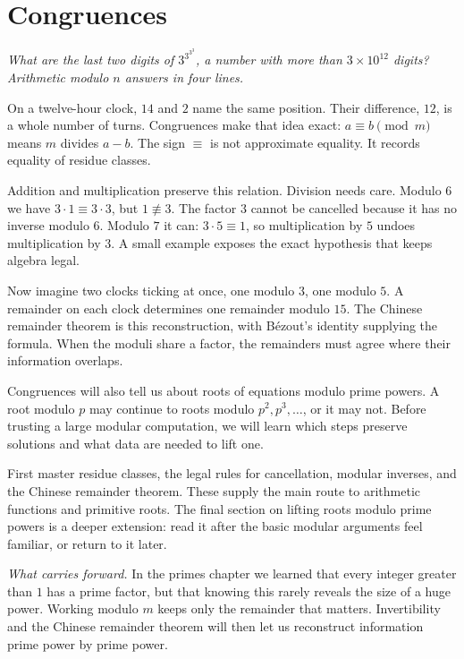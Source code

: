 \chapter{Congruences}\label{ch:congruences}

\begin{center}\itshape
What are the last two digits of $3^{3^{3^3}}$, a number with more than $3\times10^{12}$ digits?\\
Arithmetic modulo $n$ answers in four lines.
\end{center}


On a twelve-hour clock, $14$ and $2$ name the same position. Their difference, $12$, is a whole number of turns. Congruences make that idea exact: $a\equiv b\pmod m$ means $m$ divides $a-b$. The sign $\equiv$ is not approximate equality. It records equality of residue classes.

Addition and multiplication preserve this relation. Division needs care. Modulo $6$ we have $3\cdot1\equiv3\cdot3$, but $1\not\equiv3$. The factor $3$ cannot be cancelled because it has no inverse modulo $6$. Modulo $7$ it can: $3\cdot5\equiv1$, so multiplication by $5$ undoes multiplication by $3$. A small example exposes the exact hypothesis that keeps algebra legal.

Now imagine two clocks ticking at once, one modulo $3$, one modulo $5$. A remainder on each clock determines one remainder modulo $15$. The Chinese remainder theorem is this reconstruction, with Bézout's identity supplying the formula. When the moduli share a factor, the remainders must agree where their information overlaps.

Congruences will also tell us about roots of equations modulo prime powers. A root modulo $p$ may continue to roots modulo $p^2,p^3,\ldots$, or it may not. Before trusting a large modular computation, we will learn which steps preserve solutions and what data are needed to lift one.

\begin{reminder}
First master residue classes, the legal rules for cancellation, modular inverses, and the Chinese remainder theorem. These supply the main route to arithmetic functions and primitive roots. The final section on lifting roots modulo prime powers is a deeper extension: read it after the basic modular arguments feel familiar, or return to it later.
\end{reminder}


\noindent\emph{What carries forward.} In the primes chapter we learned that every integer greater than $1$ has a prime factor, but that knowing this rarely reveals the size of a huge power. Working modulo $m$ keeps only the remainder that matters. Invertibility and the Chinese remainder theorem will then let us reconstruct information prime power by prime power.

